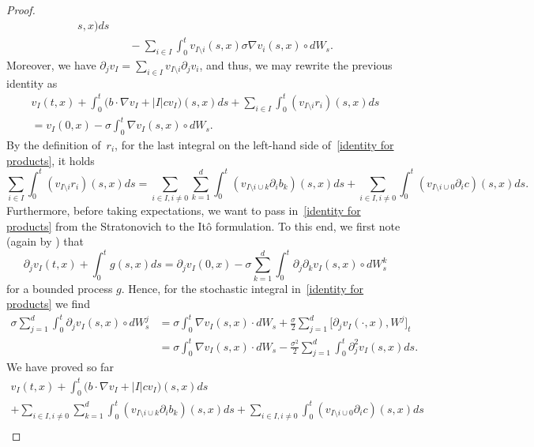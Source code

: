 \documentclass[a4paper,10pt]{article}
\newcommand\1{\mathbbm{1}}
\numberwithin{equation}{section}
\begin{document}
\begin{proof}
\begin{align*}
s,x)  ds\\
& \quad {} -\sum_{i\in I}\int_{0}^{t}v_{I\setminus i}(s,x)  \sigma\nabla
v_{i}(s,x)  \circ dW_{s} .
\end{align*}
Moreover, we have $\partial_{j}v_{I}=\sum_{i\in I}v_{I\setminus i}\partial_{j}v_{i}$, and thus, we may rewrite the previous identity as
\begin{multline}
 v_{I}(t,x)  +\int_{0}^{t} \big(b\cdot\nabla v_{I}+\left\vert
I\right\vert cv_{I}\big)  (s,x)  ds+\sum_{i\in I}\int_{0} 
^{t}(v_{I\setminus i}r_{i})  (s,x)
ds\label{identity for products}\\
 =v_{I}(0,x)  -\sigma\int_{0}^{t}\nabla v_{I}(
s,x)  \circ dW_{s} .
\end{multline}
By the definition of~$r_i$, for the last integral on the left-hand side of~\eqref{identity for products}, it holds
\begin{equation*}
\sum_{i\in I}\int_{0}^{t}(v_{I\setminus i}r_{i})  (
s,x)  ds=\sum_{i\in I,i\neq0}\sum_{k=1}^{d}\int_{0}^{t}(
v_{I\setminus i\cup k}\partial_{i}b_{k})  (s,x)
ds+\sum_{i\in I,i\neq0}\int_{0}^{t}(v_{I\setminus i\cup0}\partial
_{i}c)  (s,x)  ds .
\end{equation*}
Furthermore, before taking expectations, we want to pass in~\eqref{identity for products} from the Stratonovich to the It\^o formulation. To this end, we first note (again by \cite[Theorem 7.10]{KUNITA84}) that
\[
\partial_{j}v_{I}(t,x)  +\int_{0}^{t}g(s,x)
ds=\partial_{j}v_{I}(0,x)  -\sigma\sum_{k=1}^{d}\int_{0} 
^{t}\partial_{j}\partial_{k}v_{I}(s,x)  \circ dW_{s}^{k} 
\]
for a bounded process $g$. Hence, for the stochastic integral in~\eqref{identity for products} we find
\begin{align*}
\sigma\sum_{j=1}^{d}\int_{0}^{t}\partial_{j}v_{I}(s,x)  \circ
dW_{s}^{j}  &  =\sigma\int_{0}^{t}\nabla v_{I}(s,x)  \cdot
dW_{s}+\frac{\sigma}{2}\sum_{j=1}^{d}\big[  \partial_{j}v_{I}(
\cdot,x)  ,W^{j}\big]_{t}\\
&  =\sigma\int_{0}^{t}\nabla v_{I}(s,x)  \cdot dW_{s} 
-\frac{\sigma^{2}}{2}\sum_{j=1}^{d}\int_{0}^{t}\partial_{j}^{2}v_{I}(
s,x)  ds .
\end{align*}
We have proved so far
\begin{multline*}
v_{I}(t,x)  +\int_{0}^{t} \big(b\cdot\nabla v_{I}+\left\vert
I\right\vert cv_{I}\big)  (s,x)  ds\\
 +\sum_{i\in I,i\neq0}\sum_{k=1}^{d}\int_{0}^{t}(v_{I\setminus i\cup
k}\partial_{i}b_{k})  (s,x)  ds+ \sum_{i\in I,i\neq0} 
\int_{0}^{t}(v_{I\setminus i\cup0}\partial_{i}c)  (
s,x)  ds\\

\end{multline*}
\end{proof}
\end{document}
